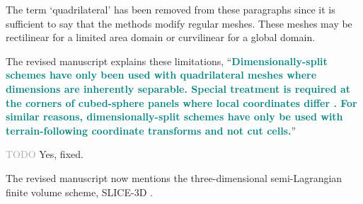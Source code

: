 \documentclass[times]{elsarticle}
\newcommand{\TODO}[1]{\textcolor{darkgray}{TODO \textit{#1}}}
\newcommand{\revtwo}[1]{\textcolor{teal}{\textbf{#1}}}
\begin{document}
\begin{quotation}
\begin{comment}
\item The first two paragraphs on p2 refer to quadrilateral meshes. It seems the discussion
has slipped into the 2D vertical slice case without explicitly saying so.
\end{comment}
\end{quotation}
The term `quadrilateral' has been removed from these paragraphs since it is sufficient to say that the methods modify regular meshes.  These meshes may be rectilinear for a limited area domain or curvilinear for a global domain.

\begin{quotation}
\begin{comment}
\item P2, 5th paragraph. Perhaps mention that dimensionally-split schemes are only possible
when the grid permits it (e.g.\ not a hexagonal grid).
\end{comment}
\end{quotation}
The revised manuscript explains these limitations, ``\revtwo{Dimensionally-split schemes have only been used with quadrilateral meshes where dimensions are inherently separable.  Special treatment is required at the corners of cubed-sphere panels where local coordinates differ \citep{putman-lin2007,katta2015}.
For similar reasons, dimensionally-split schemes have only be used with terrain-following coordinate transforms and not cut cells.}''

\begin{quotation}
\begin{comment}
\item P9, last sentence of section 2.1. Should $w_d$ be $m_d$?
\end{comment}
\end{quotation}
\TODO{}
Yes, fixed.

\begin{quotation}
\begin{comment}
\item The discussion of previous work is generally very good. On p2 is it worth mentioning
the SLICE scheme of Zerroukat and co-authors? In the first paragraph of section 3.3, credit
for the hexagonal-icosahedral mesh should probably be given to Heikes and Randall.
\end{comment}
\end{quotation}
The revised manuscript now mentions the three-dimensional semi-Lagrangian finite volume scheme, SLICE-3D \citep{zerroukat-allen2012}.
\end{document}
